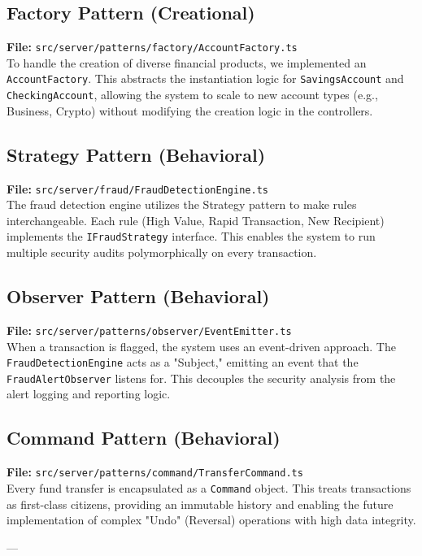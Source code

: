 \documentclass[11pt,a4paper]{article}
\begin{document}
\subsection{Factory Pattern (Creational)}
\textbf{File:} \texttt{src/server/patterns/factory/AccountFactory.ts} \\
To handle the creation of diverse financial products, we implemented an \texttt{AccountFactory}. This abstracts the instantiation logic for \texttt{SavingsAccount} and \texttt{CheckingAccount}, allowing the system to scale to new account types (e.g., Business, Crypto) without modifying the creation logic in the controllers.

\subsection{Strategy Pattern (Behavioral)}
\textbf{File:} \texttt{src/server/fraud/FraudDetectionEngine.ts} \\
The fraud detection engine utilizes the Strategy pattern to make rules interchangeable. Each rule (High Value, Rapid Transaction, New Recipient) implements the \texttt{IFraudStrategy} interface. This enables the system to run multiple security audits polymorphically on every transaction.

\subsection{Observer Pattern (Behavioral)}
\textbf{File:} \texttt{src/server/patterns/observer/EventEmitter.ts} \\
When a transaction is flagged, the system uses an event-driven approach. The \texttt{FraudDetectionEngine} acts as a "Subject," emitting an event that the \texttt{FraudAlertObserver} listens for. This decouples the security analysis from the alert logging and reporting logic.

\subsection{Command Pattern (Behavioral)}
\textbf{File:} \texttt{src/server/patterns/command/TransferCommand.ts} \\
Every fund transfer is encapsulated as a \texttt{Command} object. This treats transactions as first-class citizens, providing an immutable history and enabling the future implementation of complex "Undo" (Reversal) operations with high data integrity.

---
\end{document}
